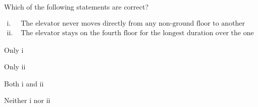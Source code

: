 \documentclass[journal]{IEEEtran}
\begin{document}
\begin{enumerate}
Which of the following statements are correct?

\begin{align*}
\text{i. } & \text{The elevator never moves directly from any non-ground floor to another non-ground floor over the one hour period}\\
\text{ii. } & \text{The elevator stays on the fourth floor for the longest duration over the one hour period}
\end{align*}

\begin{enumerate}
\begin{multicols}{2}
    \item Only i
    \item Only ii
    \item Both i and ii
    \item Neither i nor ii
\end{multicols}
\end{enumerate}

\end{enumerate}
\end{document}
